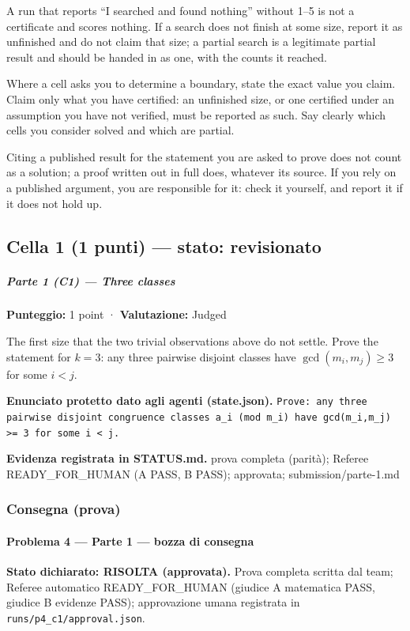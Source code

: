 \documentclass[11pt,a4paper]{article}
\begin{document}
A run that reports ``I searched and found nothing'' without 1--5 is not
a certificate and scores nothing. If a search does not finish at some
size, report it as unfinished and do not claim that size; a partial
search is a legitimate partial result and should be handed in as one,
with the counts it reached.

Where a cell asks you to determine a boundary, state the exact value you
claim. Claim only what you have certified: an unfinished size, or one
certified under an assumption you have not verified, must be reported as
such. Say clearly which cells you consider solved and which are partial.

Citing a published result for the statement you are asked to prove does
not count as a solution; a proof written out in full does, whatever its
source. If you rely on a published argument, you are responsible for it:
check it yourself, and report it if it does not hold up.

\subsection{Cella 1 (1 punti) — stato: revisionato}
\subparagraph{Parte 1 (C1) --- Three
classes}\label{parte-1-c1-three-classes}

\textbf{Punteggio:} 1 point · \textbf{Valutazione:} Judged

The first size that the two trivial observations above do not settle.
Prove the statement for \(k = 3\): any three pairwise disjoint classes
have \(\gcd(m_i, m_j) \ge 3\) for some \(i < j\).

\textbf{Enunciato protetto dato agli agenti (state.json).} \texttt{Prove: any three pairwise disjoint congruence classes a\_i (mod m\_i) have gcd(m\_i,m\_j) \textgreater{}= 3 for some i \textless{} j.}

\textbf{Evidenza registrata in STATUS.md.} prova completa (parità); Referee READY\_FOR\_HUMAN (A PASS, B PASS); approvata; submission/parte-1.md

\subsubsection{Consegna (prova)}
\paragraph{Problema 4 --- Parte 1 --- bozza di
consegna}\label{problema-4-parte-1-bozza-di-consegna}

\textbf{Stato dichiarato: RISOLTA (approvata).} Prova completa scritta
dal team; Referee automatico READY\_FOR\_HUMAN (giudice A matematica
PASS, giudice B evidenze PASS); approvazione umana registrata in
\texttt{runs/p4\_c1/approval.json}.
\end{document}
